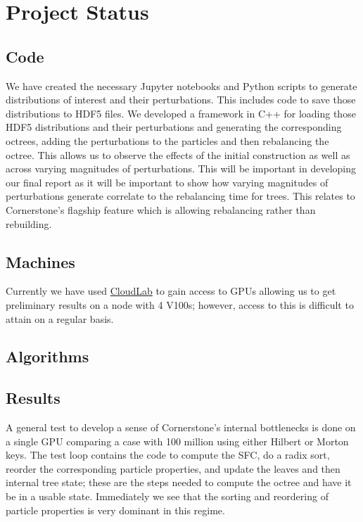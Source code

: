 \section{Project Status}

\subsection{Code}
We have created the necessary Jupyter notebooks and Python scripts to generate distributions of interest and their perturbations. This includes code to save those distributions to HDF5 files. We developed a framework in C++ for loading those HDF5 distributions and their perturbations and generating the corresponding octrees, adding the perturbations to the particles and then rebalancing the octree. This allows us to observe the effects of the initial construction as well as across varying magnitudes of perturbations. This will be important in developing our final report as it will be important to show how varying magnitudes of perturbations generate correlate to the rebalancing time for trees. This relates to Cornerstone's flagship feature which is allowing rebalancing rather than rebuilding. 

\subsection{Machines}
Currently we have used \href{https://www.cloudlab.us/}{CloudLab} to gain access to GPUs allowing us to get preliminary results on a node with 4 V100s; however, access to this is difficult to attain on a regular basis. 

\subsection{Algorithms}


\subsection{Results}
A general test to develop a sense of Cornerstone's internal bottlenecks is done on a single GPU comparing a case with 100 million using either Hilbert or Morton keys. The test loop contains the code to compute the SFC, do a radix sort, reorder the corresponding particle properties, and update the leaves and then internal tree state; these are the steps needed to compute the octree and have it be in a usable state. Immediately we see that the sorting and reordering of particle properties is very dominant in this regime. 

